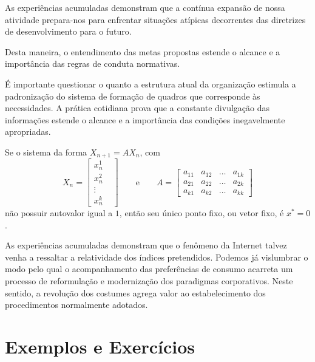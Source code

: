 \documentclass[fleqn]{profmat-cefet}
\begin{document}
\begin{corolario}
  As experiências acumuladas demonstram que a contínua expansão de nossa
  atividade prepara-nos para enfrentar situações atípicas decorrentes das
  diretrizes de desenvolvimento para o futuro.
\end{corolario}

\begin{corolario}
  Desta maneira, o entendimento das metas propostas estende o alcance e a
  importância das regras de conduta normativas.
\end{corolario}

É importante questionar o quanto a estrutura atual da organização estimula a
padronização do sistema de formação de quadros que corresponde às necessidades.
A prática cotidiana prova que a constante divulgação das informações estende o
alcance e a importância das condições inegavelmente apropriadas. 

\begin{teorema}
    Se o sistema da forma $X_{n+1}=AX_n$, com 
    \[ X_n= \left[\begin{array}{cccc}
            x_n^1  &  \\
            x_n^2  &  \\
            \vdots &  \\
            x_n^k  &
    \end{array} \right]
    \qquad \text{e} \qquad  A= \left[\begin{array}{cccc}
            a_{11} & a_{12} & \dots & a_{1k} \\
            a_{21} & a_{22} & \dots & a_{2k} \\
            a_{k1} & a_{k2} & \dots & a_{kk}
    \end{array} \right] \]
    não possuir autovalor igual a $1$, então seu único ponto fixo, ou vetor fixo, é $x^*=0$.
\end{teorema}

As experiências acumuladas demonstram que o fenômeno da Internet talvez venha a 
ressaltar a relatividade dos índices pretendidos. Podemos já vislumbrar o modo pelo 
qual o acompanhamento das preferências de consumo acarreta um processo de reformulação
e modernização dos paradigmas corporativos. Neste sentido, a revolução dos
costumes agrega valor ao estabelecimento dos procedimentos normalmente adotados. 

\section{Exemplos e Exercícios}
\label{sec:exemplos_e_exercicios}
\end{document}
